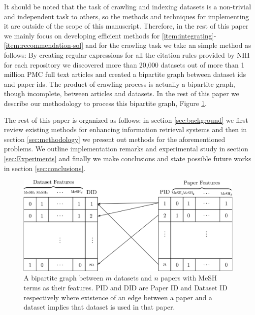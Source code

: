 \documentclass[twoside,11pt]{article}
\begin{document}
It should be noted that the task of crawling and indexing datasets is a non-trivial and independent task to others, so the methods and techniques for implementing it are outside of the scope of this manuscript. Therefore, in the rest of this paper we mainly focus on developing efficient methods for \eqref{item:integrating}-\eqref{item:recommendation-sol} and for the crawling task we take an simple method as follows: 
By creating regular expressions for all the citation rules provided by NIH for each repository we discovered more than 20,000 datasets out of more than 1 million PMC full text articles and created a bipartite graph between dataset ids and paper ids. The  product of crawling process is actually a bipartite graph, though incomplete, between articles and datasets. In the rest of this paper we describe our methodology to process this bipartite graph, Figure \ref{fig:bipartite}.

The rest of this paper is organized as follows: in section \ref{sec:background} we first review existing methods for enhancing information retrieval systems and then in section \ref{sec:methodology} we present out methods for the aforementioned problems. We outline implementation remarks and experimental study in section \ref{sec:Experiments} and finally we make conclusions and state possible future works in section \ref{sec:conclusions}.

\begin{figure}\label{fig:bipartite}
\centering
\includegraphics[scale=0.7]{bipartite.png}
\caption{A bipartite graph between $m$ datasets and $n$ papers with MeSH terms as their features. PID and DID are Paper ID and Dataset ID respectively where existence of an edge between a paper and a dataset implies that dataset is used in that paper.}
\end{figure}
\end{document}
